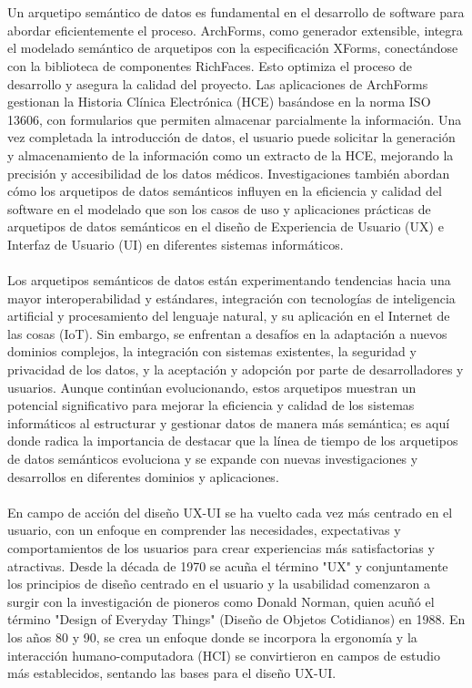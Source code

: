 \documentclass[12pt,a4paper]{article}
\begin{document}
\\\\
Un arquetipo semántico de datos es fundamental en el desarrollo de software para abordar eficientemente el proceso. ArchForms, como generador extensible, integra el modelado semántico de arquetipos con la especificación XForms, conectándose con la biblioteca de componentes RichFaces. Esto optimiza el proceso de desarrollo y asegura la calidad del proyecto. Las aplicaciones de ArchForms gestionan la Historia Clínica Electrónica (HCE) basándose en la norma ISO 13606, con formularios que permiten almacenar parcialmente la información. Una vez completada la introducción de datos, el usuario puede solicitar la generación y almacenamiento de la información como un extracto de la HCE, mejorando la precisión y accesibilidad de los datos médicos. Investigaciones también abordan cómo los arquetipos de datos semánticos influyen en la eficiencia y calidad del software en el modelado que son los casos de uso y aplicaciones prácticas de arquetipos de datos semánticos en el diseño de Experiencia de Usuario (UX) e Interfaz de Usuario (UI) en diferentes sistemas informáticos.
\\\\
Los arquetipos semánticos de datos están experimentando tendencias hacia una mayor interoperabilidad y estándares, integración con tecnologías de inteligencia artificial y procesamiento del lenguaje natural, y su aplicación en el Internet de las cosas (IoT). Sin embargo, se enfrentan a desafíos en la adaptación a nuevos dominios complejos, la integración con sistemas existentes, la seguridad y privacidad de los datos, y la aceptación y adopción por parte de desarrolladores y usuarios. Aunque continúan evolucionando, estos arquetipos muestran un potencial significativo para mejorar la eficiencia y calidad de los sistemas informáticos al estructurar y gestionar datos de manera más semántica; es aquí donde radica la importancia de destacar que la línea de tiempo de los arquetipos de datos semánticos evoluciona y se expande con nuevas investigaciones y desarrollos en diferentes dominios y aplicaciones. 
\\\\
En campo de acción del diseño UX-UI se ha vuelto cada vez más centrado en el usuario, con un enfoque en comprender las necesidades, expectativas y comportamientos de los usuarios para crear experiencias más satisfactorias y atractivas. Desde la década de 1970 se acuña el término "UX" y conjuntamente los principios de diseño centrado en el usuario y la usabilidad comenzaron a surgir con la investigación de pioneros como Donald Norman, quien acuñó el término "Design of Everyday Things" (Diseño de Objetos Cotidianos) en 1988. En los años 80 y 90, se crea un enfoque donde se incorpora la ergonomía y la interacción humano-computadora (HCI) se convirtieron en campos de estudio más establecidos, sentando las bases para el diseño UX-UI. 
\end{document}
